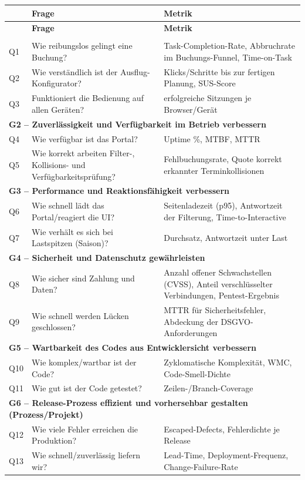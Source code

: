 \documentclass[
	fontsize=12pt,          %
	paper=a4,               %
	numbers=noenddot,       %
	listof=totoc,           %
	listof=entryprefix,     %
	listof=nochaptergap,    %
	bibliography=totoc,     %
	parskip=half,           %
	openany                 %
]{scrbook}
\begin{document}
\begin{longtable}{| p{0.6cm} | p{4.6cm} | p{6.3cm} |}
	\hline
	\textbf{} & \textbf{Frage} & \textbf{Metrik} \\ \hline
	\endfirsthead
	\hline
	\textbf{} & \textbf{Frage} & \textbf{Metrik} \\ \hline
	\endhead
	\hline
	\endfoot
	\multicolumn{3}{|l|}{\textbf{G1 -- Gebrauchstauglichkeit aus Sicht der Kunden
	verbessern}} \\ \hline
	Q1 & Wie reibungslos gelingt eine Buchung? & Task-Completion-Rate,
	Abbruchrate im Buchungs-Funnel, Time-on-Task \\ \hline
	Q2 & Wie verständlich ist der Ausflug-Konfigurator? & Klicks/Schritte bis zur
	fertigen Planung, SUS-Score \\ \hline
	Q3 & Funktioniert die Bedienung auf allen Geräten? & erfolgreiche Sitzungen je
	Browser/Gerät \\ \hline
	\multicolumn{3}{|l|}{\textbf{G2 -- Zuverlässigkeit und Verfügbarkeit im Betrieb
	verbessern}} \\ \hline
	Q4 & Wie verfügbar ist das Portal? & Uptime \%, MTBF, MTTR \\ \hline
	Q5 & Wie korrekt arbeiten Filter-, Kollisions- und Verfügbarkeitsprüfung? &
	Fehlbuchungsrate, Quote korrekt erkannter Terminkollisionen \\ \hline
	\multicolumn{3}{|l|}{\textbf{G3 -- Performance und Reaktionsfähigkeit
	verbessern}} \\ \hline
	Q6 & Wie schnell lädt das Portal/reagiert die UI? & Seitenladezeit (p95),
	Antwortzeit der Filterung, Time-to-Interactive \\ \hline
	Q7 & Wie verhält es sich bei Lastspitzen (Saison)? & Durchsatz, Antwortzeit
	unter Last \\ \hline
	\multicolumn{3}{|l|}{\textbf{G4 -- Sicherheit und Datenschutz gewährleisten}}
	\\ \hline
	Q8 & Wie sicher sind Zahlung und Daten? & Anzahl offener Schwachstellen
	(CVSS), Anteil verschlüsselter Verbindungen, Pentest-Ergebnis \\ \hline
	Q9 & Wie schnell werden Lücken geschlossen? & MTTR für Sicherheitsfehler,
	Abdeckung der DSGVO-Anforderungen \\ \hline
	\multicolumn{3}{|l|}{\textbf{G5 -- Wartbarkeit des Codes aus Entwicklersicht
	verbessern}} \\ \hline
	Q10 & Wie komplex/wartbar ist der Code? & Zyklomatische Komplexität, WMC,
	Code-Smell-Dichte \\ \hline
	Q11 & Wie gut ist der Code getestet? & Zeilen-/Branch-Coverage \\ \hline
	\multicolumn{3}{|l|}{\textbf{G6 -- Release-Prozess effizient und vorhersehbar
	gestalten (Prozess/Projekt)}} \\ \hline
	Q12 & Wie viele Fehler erreichen die Produktion? & Escaped-Defects,
	Fehlerdichte je Release \\ \hline
	Q13 & Wie schnell/zuverlässig liefern wir? & Lead-Time, Deployment-Frequenz,
	Change-Failure-Rate \\ \hline
\end{longtable}
\end{document}
